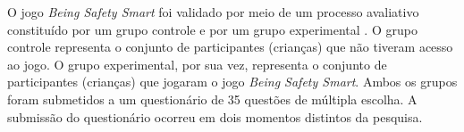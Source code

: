 O jogo \textit{Being Safety Smart} foi validado por meio de um processo avaliativo constituído por um grupo controle e por um grupo experimental \cite{jones2010being}. O grupo controle representa o conjunto de participantes (crianças) que não tiveram acesso ao jogo. O grupo experimental, por sua vez, representa o conjunto de participantes (crianças) que jogaram o jogo \textit{Being Safety Smart}. Ambos os grupos foram submetidos a um questionário de 35 questões de múltipla escolha. A submissão do questionário ocorreu em dois momentos distintos da pesquisa. 

